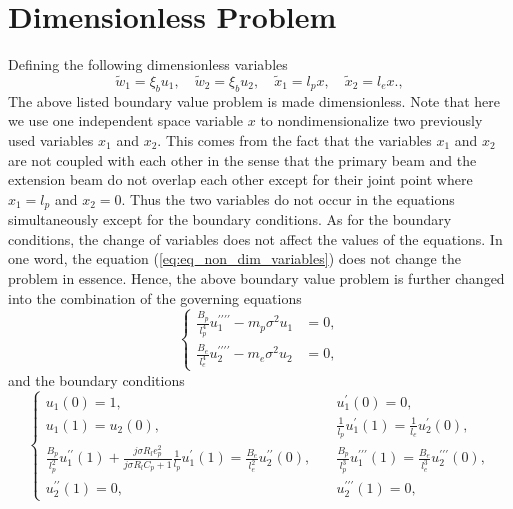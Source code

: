 \documentclass{elsarticle}
\begin{document}
\section{Dimensionless Problem}
Defining the following dimensionless variables
\begin{equation}
    \tilde{w}_1 = \xi_b u_1,\quad \tilde{w}_2 = \xi_b u_2,\quad \tilde{x}_1 = l_p x,\quad \tilde{x}_2 = l_e x.,
    \label{eq:eq_non_dim_variables}
\end{equation}
The above listed boundary value problem is made dimensionless. Note that here we use one independent space variable $x$ to nondimensionalize two previously used variables $x_1$ and $x_2$. This comes from the fact that the variables $x_1$ and $x_2$ are not coupled with each other in the sense that the primary beam and the extension beam  do not overlap each other except for their joint point where $x_1 = l_p$ and $x_2 = 0$. Thus the two variables do not occur in the equations simultaneously except for the boundary conditions. As for the boundary conditions, the change of variables does not affect the values of the equations. In one word, the equation (\ref{eq:eq_non_dim_variables}) does not change the problem in essence. Hence, the above boundary value problem is further changed into the combination of the governing equations
\begin{equation}
    \left\{\begin{aligned}
        \frac{B_p}{l_p^4} u_1^{\prime\prime\prime\prime} - m_p \sigma^2 u_1 &= 0, \\
        \frac{B_e}{l_e^4} u_2^{\prime\prime\prime\prime} - m_e \sigma^2 u_2 &= 0, 
    \end{aligned}\right.
    \label{eq:eq_balance_equations_nondim}
\end{equation}
and the boundary conditions
\begin{equation}
    \left\{\begin{aligned}
        u_1(0) = 1 , &\quad u_1^\prime(0) = 0, \\
        u_1(1) = u_2(0), &\quad \frac{1}{l_p} u_1^\prime(1) = \frac{1}{l_e} u_2^\prime(0), \\
        \frac{B_p}{l_p^2} u_1^{\prime\prime}(1) + \frac{j \sigma R_l e_p^2}{j \sigma R_l C_p + 1} \frac{1}{l_p} u_1^{\prime}(1) = \frac{B_e}{l_e^2} u_2^{\prime\prime}(0) , &\quad \frac{B_p}{l_p^3} u_1^{\prime\prime\prime}(1) = \frac{B_e}{l_e^3} u_2^{\prime\prime\prime}(0), \\
        u_2^{\prime\prime}(1) = 0 , &\quad u_2^{\prime\prime\prime}(1) = 0,
    \end{aligned}\right.
    \label{eq:eq_boundary_conditions_nondim}
\end{equation}
\end{document}
